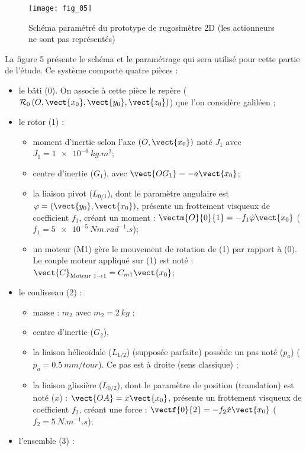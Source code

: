 \ifprof
\else
\begin{figure}[H]
\centering
\texttt{[image: fig\_05]}
\caption{\label{fig_05} Schéma paramétré du prototype de rugosimètre 2D (les actionneurs ne sont pas représentés)}
\end{figure}

La figure 5 présente le schéma et le paramétrage qui sera utilisé pour cette partie de l’étude. Ce système
comporte quatre pièces :
\begin{itemize}
\item le bâti (0). On associe à cette pièce le repère ($\mathcal{R}_0\left(O, \vect{x_0}, \vect{y_0}, \vect{z_0}\right)$) que l’on considère galiléen ;
\item le rotor (1) :
\begin{itemize}
\item moment d’inertie selon l’axe $\left(O,\vect{x_0}\right)$  noté $J_1$ avec $J_1 = \SI{1e-6}{kg.m^2}$;
\item centre d’inertie ($G_1$), avec $\vect{OG_1} = -a\vect{x_0}$;
\item la liaison pivot ($L_{0/1}$), dont le paramètre angulaire est $\varphi = \left(\vect{y_0},\vect{x_0}\right)$, présente un frottement visqueux de coefficient $f_1$, créant un moment : $\vectm{O}{0}{1} = -f_1 \dot{\varphi} \vect{x_0}$ ($f_1 = \SI{5e-5}{Nm.rad^{-1}.s}$);
\item un moteur (M1) gère le mouvement de rotation de (1) par rapport à (0). Le couple moteur
appliqué sur (1) est noté : $\vect{C}_{\text{Moteur 1}\rightarrow 1}=C_{m1}\vect{x_0}$;
\end{itemize}
\item le coulisseau (2) :
\begin{itemize}
\item masse : $m_2$ avec $m_2 = \SI{2}{kg}$ ;
\item centre d’inertie ($G_2$),
\item la liaison hélicoïdale ($L_{1/2}$) (supposée parfaite) possède un pas noté ($p_a$) ($p_a = \SI{0,5}{mm/tour}$).
Ce pas est à droite (sens classique) ;
\item la liaison glissière ($L_{0/2}$), dont le paramètre de position (translation) est noté ($x$) : $\vect{OA} = x\vect{x_0}$, présente un frottement visqueux de coefficient $f_2$, créant une force : $\vectf{0}{2}=-f_2 \dot{x}\vect{x_0}$ ($f_2 = \SI{5}{N.m^{-1}.s}$);
\end{itemize}
\item l’ensemble (3) :
\begin{itemize}

\end{itemize}
\end{itemize}
